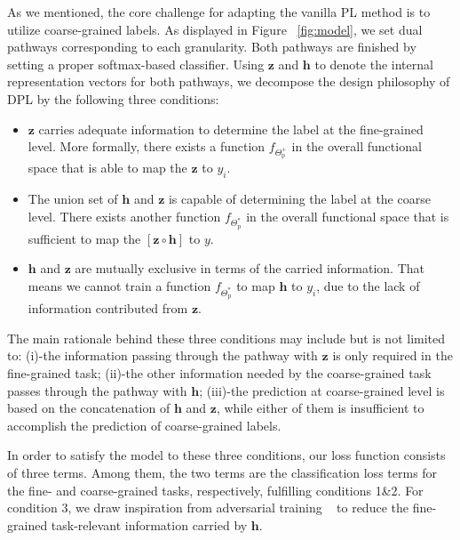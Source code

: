 \documentclass[11pt]{article}
\newcommand{\bz}{\mathbf{z}}
\newcommand{\bh}{\mathbf{h}}
\begin{document}
As we mentioned, the core challenge for adapting the vanilla PL method is to utilize coarse-grained labels.
As displayed in Figure ~\ref{fig:model}, we set dual pathways corresponding to each granularity. Both pathways are finished by setting a proper softmax-based classifier.
Using $\bz$ and $\bh$ to denote the internal representation vectors for both pathways, we decompose the design philosophy of DPL by the following three conditions:









\begin{itemize}
    \item
    $\bz$ carries adequate information to determine the label at the fine-grained level. More formally, there exists a function $f_{\Theta^+_\text{p}}$ in the overall functional space that is able to map the $\bz$ to $y_i$.
\item The union set of $\bh$ and $\bz$ is capable of determining the label at the coarse level.
    There exists another function $f_{\Theta^*_\text{p}}$ in the overall functional space that is sufficient to map the $[\bz \circ \bh]$ to $y$.
\item $\bh$ and $\bz$ are mutually exclusive in terms of the carried information. That means we cannot train a function $f_{\Theta^*_\text{p}}$ to map $\bh$ to $y_i$, due to the lack of information contributed from $\bz$.
\end{itemize}




The main rationale behind these three conditions may include but is not limited to: (i)-the information passing through the pathway with $\bz$ is only required in the fine-grained task; (ii)-the other information needed by the coarse-grained task passes through the pathway with $\bh$; (iii)-the prediction at coarse-grained level is based on the concatenation of $\bh$ and $\bz$, while either of them is insufficient to accomplish the prediction of coarse-grained labels.



In order to satisfy the model to these three conditions, our loss function consists of three terms.
Among them, the two terms are the classification loss terms for the fine- and coarse-grained tasks, respectively, fulfilling conditions 1\&2.
For condition 3,  we draw inspiration from adversarial training ~\cite{lample2017fader} to reduce the fine-grained task-relevant information carried by $\bh$. 
\end{document}
